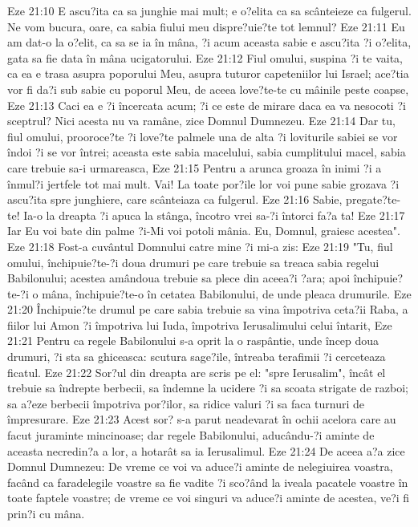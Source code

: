 Eze 21:10  E ascu?ita ca sa junghie mai mult; e o?elita ca sa scânteieze ca fulgerul. Ne vom bucura, oare, ca sabia fiului meu dispre?uie?te tot lemnul?
Eze 21:11  Eu am dat-o la o?elit, ca sa se ia în mâna, ?i acum aceasta sabie e ascu?ita ?i o?elita, gata sa fie data în mâna ucigatorului.
Eze 21:12  Fiul omului, suspina ?i te vaita, ca ea e trasa asupra poporului Meu, asupra tuturor capeteniilor lui Israel; ace?tia vor fi da?i sub sabie cu poporul Meu, de aceea love?te-te cu mâinile peste coapse,
Eze 21:13  Caci ea e ?i încercata acum; ?i ce este de mirare daca ea va nesocoti ?i sceptrul? Nici acesta nu va ramâne, zice Domnul Dumnezeu.
Eze 21:14  Dar tu, fiul omului, prooroce?te ?i love?te palmele una de alta ?i loviturile sabiei se vor îndoi ?i se vor întrei; aceasta este sabia macelului, sabia cumplitului macel, sabia care trebuie sa-i urmareasca,
Eze 21:15  Pentru a arunca groaza în inimi ?i a înmul?i jertfele tot mai mult. Vai! La toate por?ile lor voi pune sabie grozava ?i ascu?ita spre junghiere, care scânteiaza ca fulgerul.
Eze 21:16  Sabie, pregate?te-te! Ia-o la dreapta ?i apuca la stânga, încotro vrei sa-?i întorci fa?a ta!
Eze 21:17  Iar Eu voi bate din palme ?i-Mi voi potoli mânia. Eu, Domnul, graiesc acestea".
Eze 21:18  Fost-a cuvântul Domnului catre mine ?i mi-a zis:
Eze 21:19  "Tu, fiul omului, închipuie?te-?i doua drumuri pe care trebuie sa treaca sabia regelui Babilonului; acestea amândoua trebuie sa plece din aceea?i ?ara; apoi închipuie?te-?i o mâna, închipuie?te-o în cetatea Babilonului, de unde pleaca drumurile.
Eze 21:20  Închipuie?te drumul pe care sabia trebuie sa vina împotriva ceta?ii Raba, a fiilor lui Amon ?i împotriva lui Iuda, împotriva Ierusalimului celui întarit,
Eze 21:21  Pentru ca regele Babilonului s-a oprit la o raspântie, unde încep doua drumuri, ?i sta sa ghiceasca: scutura sage?ile, întreaba terafimii ?i cerceteaza ficatul.
Eze 21:22  Sor?ul din dreapta are scris pe el: "spre Ierusalim", încât el trebuie sa îndrepte berbecii, sa îndemne la ucidere ?i sa scoata strigate de razboi; sa a?eze berbecii împotriva por?ilor, sa ridice valuri ?i sa faca turnuri de împresurare.
Eze 21:23  Acest sor? s-a parut neadevarat în ochii acelora care au facut juraminte mincinoase; dar regele Babilonului, aducându-?i aminte de aceasta necredin?a a lor, a hotarât sa ia Ierusalimul.
Eze 21:24  De aceea a?a zice Domnul Dumnezeu: De vreme ce voi va aduce?i aminte de nelegiuirea voastra, facând ca faradelegile voastre sa fie vadite ?i sco?ând la iveala pacatele voastre în toate faptele voastre; de vreme ce voi singuri va aduce?i aminte de acestea, ve?i fi prin?i cu mâna.
